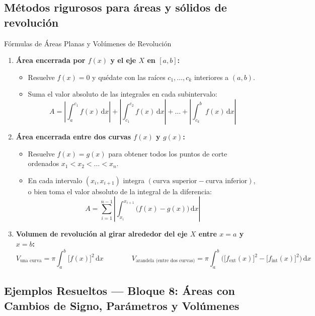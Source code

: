 \documentclass[10pt,a4paper]{article}
\begin{document}
\subsection{Métodos rigurosos para áreas y sólidos de revolución}

\begin{formulabox}{Fórmulas de Áreas Planas y Volúmenes de Revolución}
\begin{enumerate}\itemsep 2pt
  \item \textbf{Área encerrada por $f(x)$ y el eje $X$ en $[a, b]$:}
  \begin{itemize}\itemsep 1pt
    \item Resuelve $f(x) = 0$ y quédate con las raíces $c_1, \dots, c_k$ interiores a $(a, b)$.
    \item Suma el valor absoluto de las integrales en cada subintervalo:
    $$A = \left|\int_a^{c_1} f(x)\,\mathrm{d}x\right| + \left|\int_{c_1}^{c_2} f(x)\,\mathrm{d}x\right| + \dots + \left|\int_{c_k}^b f(x)\,\mathrm{d}x\right|$$
  \end{itemize}
  \item \textbf{Área encerrada entre dos curvas $f(x)$ y $g(x)$:}
  \begin{itemize}\itemsep 1pt
    \item Resuelve $f(x) = g(x)$ para obtener todos los puntos de corte ordenados $x_1 < x_2 < \dots < x_n$.
    \item En cada intervalo $(x_i, x_{i+1})$ integra $(\text{curva superior} - \text{curva inferior})$, o bien toma el valor absoluto de la integral de la diferencia:
    $$A = \sum_{i=1}^{n-1} \left|\int_{x_i}^{x_{i+1}} \big(f(x) - g(x)\big)\,\mathrm{d}x\right|$$
  \end{itemize}
  \item \textbf{Volumen de revolución al girar alrededor del eje $X$ entre $x = a$ y $x = b$:}
  $$V_{\text{una curva}} = \pi \int_a^b \big[f(x)\big]^2\,\mathrm{d}x \qquad\qquad V_{\text{arandela (entre dos curvas)}} = \pi \int_a^b \Big(\big[f_{\text{ext}}(x)\big]^2 - \big[f_{\text{int}}(x)\big]^2\Big)\,\mathrm{d}x$$
\end{enumerate}
\end{formulabox}

\subsection{Ejemplos Resueltos --- Bloque 8: Áreas con Cambios de Signo, Parámetros y Volúmenes}
\end{document}
